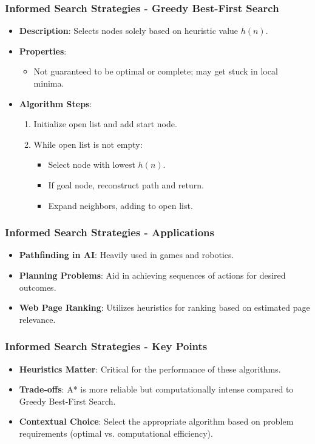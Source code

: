 \documentclass[aspectratio=169]{beamer}
\begin{document}
\begin{frame}[fragile]
    \frametitle{Informed Search Strategies - Greedy Best-First Search}
    \begin{itemize}
        \item \textbf{Description}: Selects nodes solely based on heuristic value \( h(n) \).
        
        \item \textbf{Properties}:
        \begin{itemize}
            \item Not guaranteed to be optimal or complete; may get stuck in local minima.
        \end{itemize}
        
        \item \textbf{Algorithm Steps}:
        \begin{enumerate}
            \item Initialize open list and add start node.
            \item While open list is not empty:
            \begin{itemize}
                \item Select node with lowest \( h(n) \).
                \item If goal node, reconstruct path and return.
                \item Expand neighbors, adding to open list.
            \end{itemize}
        \end{enumerate}
    \end{itemize}
\end{frame}

\begin{frame}[fragile]
    \frametitle{Informed Search Strategies - Applications}
    \begin{itemize}
        \item \textbf{Pathfinding in AI}: Heavily used in games and robotics.
        \item \textbf{Planning Problems}: Aid in achieving sequences of actions for desired outcomes.
        \item \textbf{Web Page Ranking}: Utilizes heuristics for ranking based on estimated page relevance.
    \end{itemize}
\end{frame}

\begin{frame}[fragile]
    \frametitle{Informed Search Strategies - Key Points}
    \begin{itemize}
        \item \textbf{Heuristics Matter}: Critical for the performance of these algorithms.
        \item \textbf{Trade-offs}: A* is more reliable but computationally intense compared to Greedy Best-First Search.
        \item \textbf{Contextual Choice}: Select the appropriate algorithm based on problem requirements (optimal vs. computational efficiency).
    \end{itemize}
\end{frame}
\end{document}
